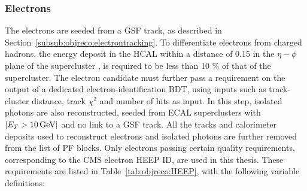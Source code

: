 \subsubsection{Electrons}
\label{sec:objreco:electrons}
The electrons are seeded from a GSF track, as described in Section~\ref{subsub:objreco:electrontracking}. To differentiate electrons from charged hadrons, the energy deposit in the HCAL within a distance of 0.15 in the $\eta-\phi$ plane of the supercluster , is required to be less than 10 \% of that of the supercluster. The electron candidate must further pass a requirement on the output of a dedicated electron-identification BDT, using inputs such as track-cluster distance, track $\chi^2$ and number of hits as input.  In this step, isolated photons are also reconstructed, seeded from ECAL superclusters with $|E_T>10 \,\text{Ge\hspace{-.08em}V}|$ and no link to a GSF track.
All the tracks and calorimeter deposits used to reconstruct electrons and isolated photons are further removed from the list of PF blocks. \newline
Only electrons passing certain quality requirements, corresponding to the CMS electron HEEP ID, are used in this thesis. These requirements are listed in Table~\ref{tab:objreco:HEEP}, with the following variable definitions:
